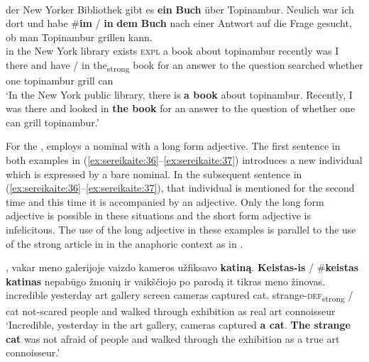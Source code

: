\documentclass[output=paper,
modfonts
]{langscibook}
\begin{document}
\begin{exe}
	\ex \label{ex:sereikaite:35}
	 \\
	 {der} {New} {Yorker} {Bibliothek} {gibt} {es} \textbf{{ein}} \textbf{{Buch}} {über} {Topinambur}. {Neulich} {war} {ich} {dort} {und} {habe} \textnormal{\#}\textbf{im} \textnormal{/} \textbf{in} \textbf{dem} \textbf{{Buch}} {nach} {einer} {Antwort} {auf} {die} {Frage} {gesucht}, {ob} {man} {Topinambur} {grillen} {kann}.\\
	in the New York library exists \textsc{expl} {a} {book} about topinambur recently was I there and have  / {in} the\textsubscript{strong} {book} for an answer to the question searched whether one topinambur grill can\\
	\trans `In the New York public library, there is \textbf{a book} about topinambur. Recently, I was there and looked in \textbf{the	book} for an answer to the question of whether one can grill topinambur.’ \citep[30]{Schwarz2009}
\end{exe}

For the ,  employs a nominal with a long form adjective. The first sentence in both examples in (\ref{ex:sereikaite:36}--\ref{ex:sereikaite:37}) introduces a new individual which is expressed by a bare nominal. In the subsequent sentence in (\ref{ex:sereikaite:36}--\ref{ex:sereikaite:37}), that individual is mentioned for the second time and this time it is accompanied by an adjective. Only the long form adjective is possible in these situations and the short form adjective is infelicitous. The use of the long adjective in these examples is parallel to the use of the strong article in  in the anaphoric context as in . 

\begin{exe}
	\ex \label{ex:sereikaite:36}
	, {vakar} {meno} {galerijoje} {vaizdo} {kameros} {užfiksavo} {\textbf{katiną}}. \textbf{Keistas-is} \textnormal{/} \textnormal{\#}\textbf{keistas} {\textbf{katinas}} {nepabūgo} {žmonių} {ir} {vaikščiojo} {po} {parodą} {it} {tikras} {meno} {žinovas}. \\
	incredible yesterday art gallery screen cameras captured {cat}. {strange-\textsc{def}\textsubscript{strong}} /  {cat} not-scared people and walked through exhibition as real art connoisseur\\
	\trans `Incredible, yesterday in the art gallery, cameras captured \textbf{a cat}. \textbf{The strange cat} was not afraid of people and walked through the exhibition as a true art connoisseur.' 
\end{exe}
\end{document}
